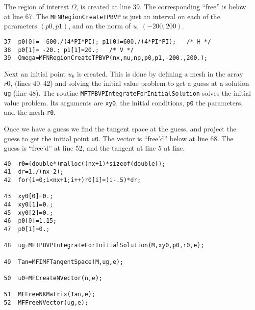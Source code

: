 \documentclass[12pt]{article}
\begin{document}
The region of interest $\Omega$, is created at line 39. The corresponding ``free'' is below at
line 67. The {\tt MFNRegionCreateTPBVP} is just an interval on each of the parameters $(p0,p1)$, and on the norm of $u$, $(-200,200)$.
\begin{verbatim}
37  p0[0]= -600./(4*PI*PI); p1[0]=600./(4*PI*PI);   /* H */
38  p0[1]= -20.; p1[1]=20.;   /* V */
39  Omega=MFNRegionCreateTPBVP(nx,nu,np,p0,p1,-200.,200.);
\end{verbatim}
Next an initial point $u_0$ is created. This is done by defining a mesh in the array $r0$, (lines 40--42) and solving the initial value
problem to get a guess at a solution {\tt ug} (line 48). The routine {\tt MFTPBVPIntegrateForInitialSolution} solves the initial value
problem. Its arguments are {\tt xy0}, the initial conditions, {\tt p0} the parameters, and the mesh {\tt r0}. 

Once we have a guess we find the tangent space at the guess, and project the guess to get the initial point {\tt u0}.
The vector is ``free'd'' below at line 68. The guess is ``free'd'' at line 52, and the tangent  at line 5 at line.
\begin{verbatim}
40  r0=(double*)malloc((nx+1)*sizeof(double));
41  dr=1./(nx-2);
42  for(i=0;i<nx+1;i++)r0[i]=(i-.5)*dr;

43  xy0[0]=0.;
44  xy0[1]=0.;
45  xy0[2]=0.;
46  p0[0]=1.15;
47  p0[1]=0.;

48  ug=MFTPBVPIntegrateForInitialSolution(M,xy0,p0,r0,e);

49  Tan=MFIMFTangentSpace(M,ug,e);

50  u0=MFCreateNVector(n,e);

51  MFFreeNKMatrix(Tan,e);
52  MFFreeNVector(ug,e);
\end{verbatim}
\end{document}
